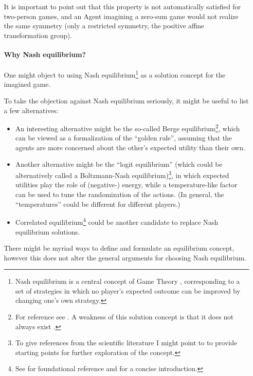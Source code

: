 \documentclass{article}
\begin{document}
It is important to point out that this property is not automatically satisfied for two-person games, and an Agent imagining a zero-sum game would not realize the same symmetry (only a restricted symmetry, the positive affine transformation group).

\paragraph{Why Nash equilibrium?}
One might object to using Nash equilibrium\footnote{Nash equilibrium is a central concept of Game Theory \cite{book:EssentialGameTheory,book:GameTheory,review:NeumannMorgensternGameThoery,book:GameTheoryOriginal}, corresponding to a set of strategies in which no player's expected outcome can be improved by changing one's own strategy.} as a solution concept for the imagined game.

To take the objection against Nash equilibrium seriously, it might be useful to list a few alternatives:
\begin{itemize}
    \item An interesting alternative might be the so-called Berge equilibrium\footnote{For reference see \cite{book:BergeEquilibrium}. A weakness of this solution concept is that it does not always exist \cite{paper:NoBergeEquilibria}.}, which can be viewed as a formalization of the ``golden rule'', assuming that the agents are more concerned about the other's expected utility than their own.
    \item Another alternative might be the ``logit equilibrium'' (which could be alternatively called a Boltzmann-Nash equilibrium)\footnote{To give references from the scientific literature I might point to \cite{paper:LogitEquilibrium,arxiv:WolpertEquilibrium} to provide starting points for further exploration of the concept.}, in which expected utilities play the role of (negative-) energy, while a temperature-like factor can be used to tune the randomization of the actions. (In general, the ``temperatures'' could be different for different players.)
    \item Correlated equilibrium\footnote{See \cite{paper:CorrelatedEquilibrium} for foundational reference and \cite{book:EssentialGameTheory} for a concise introduction.} could be another candidate to replace Nash equilibrium solutions.
\end{itemize}

There might be myriad ways to define and formulate an equilibrium concept, however this does not alter the general arguments for choosing Nash equilibrium.
\end{document}
